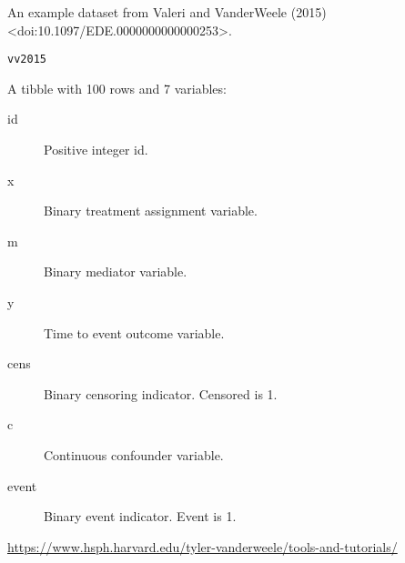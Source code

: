 \documentclass[a4paper]{book}
\begin{document}
%
\begin{Description}
An example dataset from Valeri and VanderWeele (2015) <doi:10.1097/EDE.0000000000000253>.
\end{Description}
%
\begin{Usage}
\begin{verbatim}
vv2015
\end{verbatim}
\end{Usage}
%
\begin{Format}
A tibble with 100 rows and 7 variables:
\begin{description}

\item[id] Positive integer id.
\item[x] Binary treatment assignment variable.
\item[m] Binary mediator variable.
\item[y] Time to event outcome variable.
\item[cens] Binary censoring indicator. Censored is 1.
\item[c] Continuous confounder variable.
\item[event] Binary event indicator. Event is 1.

\end{description}

\end{Format}
%
\begin{Source}
\url{https://www.hsph.harvard.edu/tyler-vanderweele/tools-and-tutorials/}
\end{Source}
\printindex{}
\end{document}

